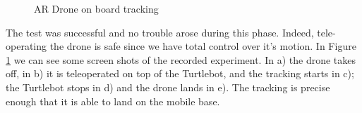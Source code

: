 \documentclass[11pt,a4paper]{article}
\begin{document}
\begin{figure}[ht!]%
	\centering
    \qquad  
    \qquad  
    \qquad  
    \qquad  
    \caption{AR Drone on board tracking}
    \label{fig:exp1}
\end{figure}

The test was successful and no trouble arose during this phase. Indeed, tele-operating the drone is 
safe since we have total control over it's motion.
In Figure \ref{fig:exp1} we can see some screen shots of the recorded experiment. In a) the drone takes off, in b) it is teleoperated on top of the Turtlebot, and the tracking starts in c); the Turtlebot stops in d) and the drone lands in e). The tracking is precise enough that it is able to land on the mobile base.
\end{document}
